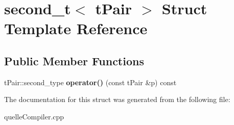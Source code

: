 \hypertarget{a00120}{}\section{second\+\_\+t$<$ t\+Pair $>$ Struct Template Reference}
\label{a00120}
\subsection*{Public Member Functions}
\begin{DoxyCompactItemize}
\item 
t\+Pair\+::second\+\_\+type {\bfseries operator()} (const t\+Pair \&p) const \hypertarget{a00120_a4c4452e56c4e12c7e43776c490eb3ba0}{}\label{a00120_a4c4452e56c4e12c7e43776c490eb3ba0}

\end{DoxyCompactItemize}


The documentation for this struct was generated from the following file\+:\begin{DoxyCompactItemize}
\item 
quelle\+Compiler.\+cpp\end{DoxyCompactItemize}
